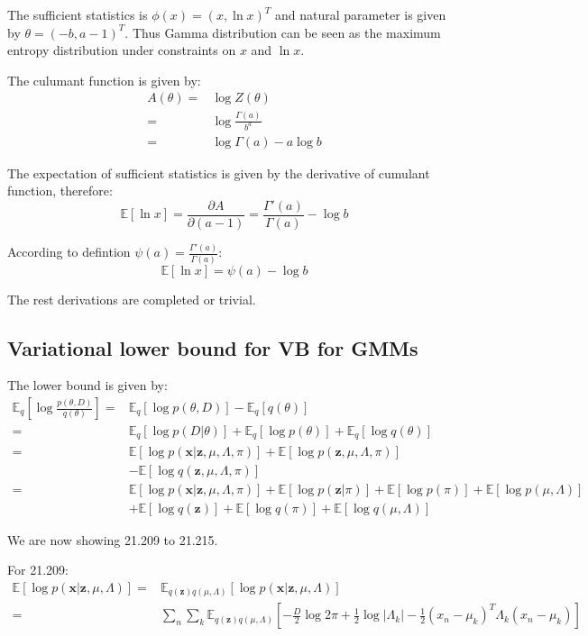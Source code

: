 \documentclass[UTF8]{ctexart}
\begin{document}
The sufficient statistics is $\phi(x)=(x,\ln x)^{T}$ and natural parameter is given by $\theta = (-b,a-1)^{T}$. Thus Gamma distribution can be seen as the maximum entropy distribution under constraints on $x$ and $\ln x$.

The culumant function is given by:
\begin{align}
A(\theta)=& \log Z(\theta)\nonumber \\
=&\log \frac{\Gamma(a)}{b^{a}} \nonumber \\
=&\log \Gamma(a) - a \log b \nonumber
\end{align}

The expectation of sufficient statistics is given by the derivative of cumulant function, therefore:
$$\mathbb{E}[\ln x] = \frac{\partial A}{\partial (a-1)} = \frac{\Gamma'(a)}{\Gamma(a)}-\log b$$

According to defintion $\psi(a)=\frac{\Gamma'(a)}{\Gamma(a)}$:
$$\mathbb{E}[\ln x] = \psi(a)-\log b$$

The rest derivations are completed or trivial.

\subsection{Variational lower bound for VB for GMMs}
The lower bound is given by:
\begin{align}
\mathbb{E}_{q}[\log \frac{p(\theta,D)}{q(\theta)}] =& \mathbb{E}_{q}[\log p(\theta,D)] -\mathbb{E}_{q}[q(\theta)]\nonumber \\
=&\mathbb{E}_{q}[\log p(D|\theta)]+\mathbb{E}_{q}[\log p(\theta)]+\mathbb{E}_{q}[\log q(\theta)] \nonumber \\
=&\mathbb{E}[\log p(\textbf{x}|\textbf{z},\mu,\Lambda,\pi)] + \mathbb{E}[\log p(\textbf{z},\mu,\Lambda,\pi)]\nonumber \\
\ &-\mathbb{E}[\log q(\textbf{z},\mu,\Lambda,\pi)]\nonumber \\
=&\mathbb{E}[\log p(\textbf{x}|\textbf{z},\mu,\Lambda,\pi)] + \mathbb{E}[\log p(\textbf{z}|\pi)] + \mathbb{E}[\log p(\pi)] + \mathbb{E}[\log p(\mu, \Lambda)] \nonumber \\
\ &+ \mathbb{E}[\log q(\textbf{z})] + \mathbb{E}[\log q(\pi)] + \mathbb{E}[\log q(\mu,\Lambda)]\nonumber
\end{align}

We are now showing 21.209 to 21.215.

For 21.209:
\begin{align}
\mathbb{E}[\log p(\textbf{x}|\textbf{z},\mu,\Lambda)]=& \mathbb{E}_{q(\textbf{z})q(\mu,\Lambda)}[\log p(\textbf{x}|\textbf{z},\mu,\Lambda)] \nonumber \\
=& \sum_{n}\sum_{k}\mathbb{E}_{q(\textbf{z})q(\mu,\Lambda)}[-\frac{D}{2}\log 2\pi + \frac{1}{2}\log |\Lambda_{k}|-\frac{1}{2}(x_{n}-\mu_{k})^{T}\Lambda_{k}(x_{n}-\mu_{k})]\nonumber
\end{align}
\end{document}
